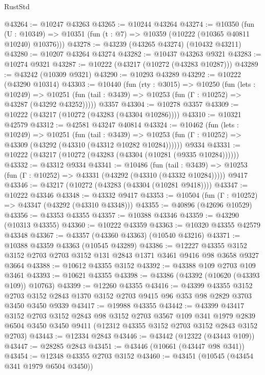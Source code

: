 \begin{lexlean}{RustStd}
\begin{coremodule}
@43264 := @10247 @43263
@43265 := @10244 @43264
@43274 := @10350
    (fun (U : @10349) => @10351 (fun (t : @7) => @10359 (@10222 (@10365 @40811 @10240) @10376)))
@43278 := @43239 (@43265 @43274) (@10432 @43211)
@43280 := @10207 @43264 @43274
@43282 := @10437 @43263 @9321
@43283 := @10274 @9321
@43287 := @10222 (@43217 (@10272 (@43283 @10287)))
@43289 := @43242 (@10309 @9321)
@43290 := @10293 @43289
@43292 := @10222 (@43290 @10314)
@43303 := @10440
    (fun (rty : @3015) =>
    @10250
      (fun (lets : @10249) =>
      @10251 (fun (tail : @3439) => @10253 (fun (Γ : @10252) => @43287 (@43292 @43252)))))
    @3357
@43304 := @10278 @3357
@43309 := @10222 (@43217 (@10272 (@43283 (@43304 @10286))))
@43310 := @10321 @42579
@43312 := @42581 @43247 @40814
@43324 := @10462
    (fun (lets : @10249) =>
    @10251
      (fun (tail : @3439) =>
      @10253 (fun (Γ : @10252) => @43309 (@43292 (@43310 (@43312 @10282 @10284))))))
    @9334
@43331 := @10222 (@43217 (@10272 (@43283 (@43304 (@10281 (@9335 @10284))))))
@43332 := @43312 @9334
@43341 := @10486
    (fun (tail : @3439) => @10253 (fun (Γ : @10252) => @43331 (@43292 (@43310 (@43332 @10284)))))
    @9417
@43346 := @43217 (@10272 (@43283 (@43304 (@10281 @9418))))
@43347 := @10222 @43346
@43348 := @43332 @9417
@43353 := @10504 (fun (Γ : @10252) => @43347 (@43292 (@43310 @43348)))
@43355 := @40896 (@42696 @10529)
@43356 := @43353 @43355
@43357 := @10388 @43346
@43359 := @43290 (@10313 @43355)
@43360 := @10222 @43359
@43363 := @10320 @43355 @42579 @43348
@43367 := @43357 (@43360 @43363) (@10540 @43216)
@43371 := @10388 @43359 @43363 (@10545 @43289)
@43386 := @12227
    @43355
    @3152
    @3152
    @2703
    @2703
    @3152
    @131
    @2843
    @1371
    @3461
    @9416
    @98
    @3658
    @9327
    @3664
@43388 := @10612 @43355 @3152
@43392 := @43388 @109 @2703 @109 @3461
@43393 := @10621 @43355
@43398 := @43386 (@43392 (@10620 (@43393 @109)) @10763)
@43399 := @12260 @43355
@43416 := @43399
    @43355
    @3152
    @2703
    @3152
    @2843
    @1370
    @3152
    @2703
    @9415
    @96
    @353
    @98
    @2829
    @3703
    @3450
    @3450
    @9339
@43417 := @19988 @43355
@43442 := @43399
    @43417
    @3152
    @2703
    @3152
    @2843
    @98
    @3152
    @2703
    @3567
    @109
    @341
    @1979
    @2839
    @6504
    @3450
    @3450
    @9411
    (@12312 @43355 @3152 @2703 @3152 @2843 @3152 @2703)
@43443 := @12334 @2843
@43446 := @43442 (@12322 (@43443 @109))
@43447 := @28285 @2843
@43451 := @43446 (@10661 (@43447 @98 @341))
@43454 := @12348 @43355 @2703 @3152
@43460 := @43451 (@10545 (@43454 @341 @1979 @6504 @3450))

\end{coremodule}
\end{lexlean}
